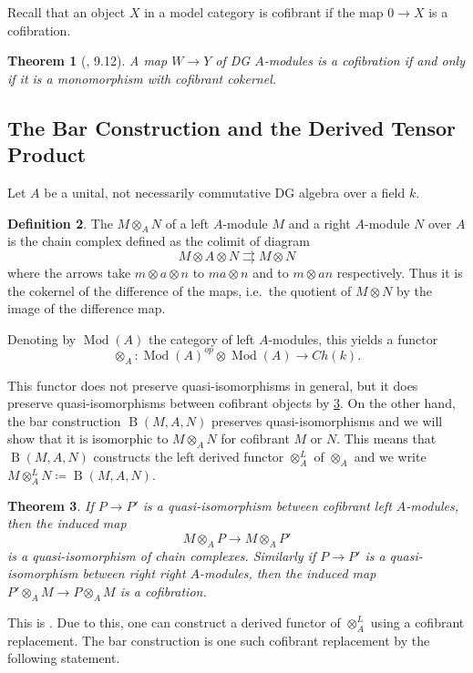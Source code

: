 \documentclass{scrartcl}
\let\emph\relax
\theoremstyle{plain}
\newtheorem{theorem}{Theorem}[section]
\theoremstyle{definition}
\newtheorem{definition}[theorem]{Definition}
\newcommand{\defeq}{\coloneqq}
\DeclareMathOperator{\Mod}{Mod}
\DeclareMathOperator{\BC}{B}
\begin{document}
Recall that an object $X$ in a model category is cofibrant if the map $0\to X$ is a cofibration. 
\begin{theorem}[\cite{barthel2013six}, 9.12]\label{thm:dg-module-cofibrant-cokernel}
    A map $W\to Y$ of DG $A$-modules is a cofibration if and only if it is a monomorphism with cofibrant cokernel. 
\end{theorem}


\subsection{The Bar Construction and the Derived Tensor Product}\label{subsec:bar-constr-derived}
Let $A$ be a unital, not necessarily commutative DG algebra over a field $k$.
\begin{definition}
The \emph{tensor product} $M\otimes_A N$ of a left $A$-module $M$ and a right $A$-module $N$ over $A$ is the chain complex defined as the colimit of diagram $$M\otimes A\otimes N\rightrightarrows M\otimes N$$
where the arrows take $m\otimes a\otimes n$ to $ma\otimes n$ and to $m\otimes an$ respectively. Thus it is the cokernel of the difference of the maps, i.e.\ the quotient of $M\otimes N$ by the image of the difference map. 
\end{definition}
Denoting by $\Mod(A)$ the category of left $A$-modules, this yields a functor 
$$\otimes_A \colon \Mod(A)^{op}\otimes \Mod(A)\to Ch(k).$$

This functor does not preserve quasi-isomorphisms in general, but it does preserve quasi-isomorphisms between cofibrant objects by \cref{thm:tensor-product-quasi-iso}. On the other hand, the bar construction $\BC(M, A, N)$ preserves quasi-isomorphisms and we will show that it is isomorphic to $M \otimes_A N$ for cofibrant $M$ or $N$. This means that $\BC(M, A, N)$ constructs the left derived functor $\otimes_A^L$ of $\otimes_A$ and we write $M\otimes_A^L N\defeq \BC(M, A, N)$. 

\begin{theorem}\label{thm:tensor-product-quasi-iso}
    If $P\to P'$ is a quasi-isomorphism between cofibrant left $A$-modules, then the induced map
    $$M\otimes_A P\to M\otimes_A P'$$
    is a quasi-isomorphism of chain complexes. Similarly if $P\to P'$ is a quasi-isomorphism between right right $A$-modules, then the induced map $P'\otimes_A M\to P\otimes_A M$ is a cofibration. 
\end{theorem}
This is \cite[3.2]{hinich1997homological}. Due to this, one can construct a derived functor of $\otimes^L_A$ using a cofibrant replacement. The bar construction is one such cofibrant replacement by the following statement. 
\end{document}
